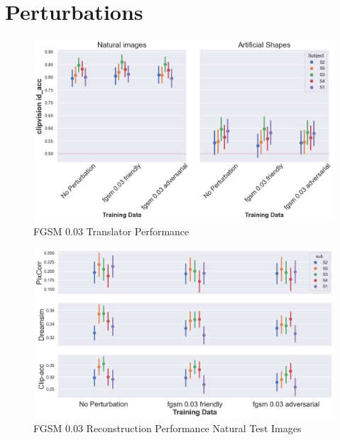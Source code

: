 \section{Perturbations}
\begin{figure}[ht]
    \centering
    \includegraphics[width=1\textwidth]{plots/advpert_translator_fgsm_0.03.png}
    \caption{FGSM 0.03 Translator Performance}\label{fig:advpert_translator_fgsm_0}
\end{figure}

\begin{figure}[ht]
    \centering
    \includegraphics[width=1\textwidth]{plots/advpert_reconstruction_test_fgsm_0.03.png}
    \caption{FGSM 0.03 Reconstruction Performance Natural Test Images}\label{fig:advpert_reconstruction_test_fgsm_0.03}
\end{figure}

